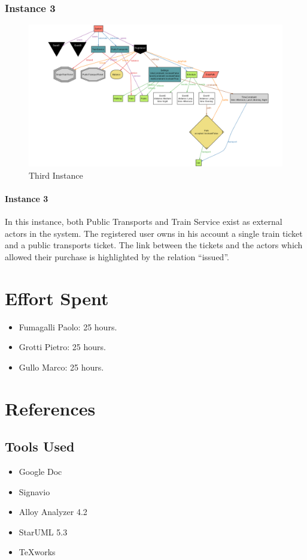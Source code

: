 \documentclass{article}
\begin{document}
\subsubsection{Instance 3}
\begin{figure}[H]
\includegraphics[width=\linewidth]{Instance_3.png}
\caption{Third Instance}
\label{fig:ALLOY3}
\end{figure}
\paragraph{Instance 3}
In this instance, both Public Transports and Train Service exist as external actors in the system. The registered user owns in his account a single train ticket and a public transports ticket. The link between the tickets and the actors which allowed their purchase is highlighted by the relation “issued”.
\newpage
\section{Effort Spent}
\begin{itemize}
\item{Fumagalli Paolo:} 25 hours.
\item{Grotti Pietro:} 25 hours.
\item{Gullo Marco:} 25 hours.
\end{itemize}
\section{References}
\subsection{Tools Used}
\begin{itemize}
\item{} Google Doc
\item{} Signavio
\item{} Alloy Analyzer 4.2
\item{} StarUML 5.3
\item{} TeXworks
\end{itemize}
\end{document}
